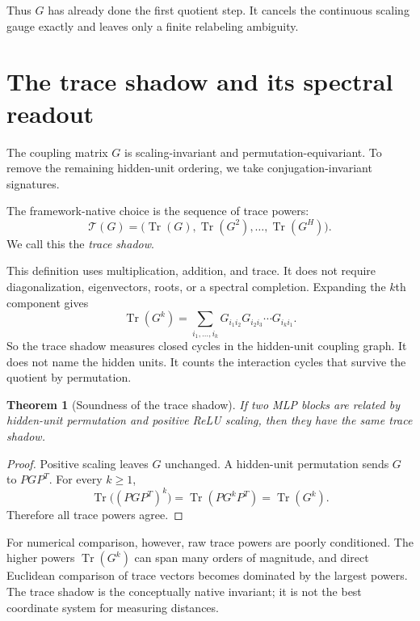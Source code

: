\documentclass[11pt]{article}
\newtheorem{theorem}{Theorem}
\newcommand{\Tr}{\operatorname{Tr}}
\newcommand{\TraceShadow}{\mathcal{T}}
\begin{document}
Thus $G$ has already done the first quotient step. It cancels the continuous scaling gauge exactly and leaves only a finite relabeling ambiguity.

\section{The trace shadow and its spectral readout}

The coupling matrix $G$ is scaling-invariant and permutation-equivariant. To remove the remaining hidden-unit ordering, we take conjugation-invariant signatures.

The framework-native choice is the sequence of trace powers:
\begin{equation}
  \TraceShadow(G)=\bigl(\Tr(G),\Tr(G^2),\ldots,\Tr(G^H)\bigr).
  \label{eq:trace-shadow}
\end{equation}
We call this the \emph{trace shadow}.

This definition uses multiplication, addition, and trace. It does not require diagonalization, eigenvectors, roots, or a spectral completion. Expanding the $k$th component gives
\begin{equation}
\Tr(G^k)=\sum_{i_1,\ldots,i_k}G_{i_1i_2}G_{i_2i_3}\cdots G_{i_ki_1}.
\label{eq:closed-walks}
\end{equation}
So the trace shadow measures closed cycles in the hidden-unit coupling graph. It does not name the hidden units. It counts the interaction cycles that survive the quotient by permutation.

\begin{theorem}[Soundness of the trace shadow]
If two MLP blocks are related by hidden-unit permutation and positive ReLU scaling, then they have the same trace shadow.
\end{theorem}

\begin{proof}
Positive scaling leaves $G$ unchanged. A hidden-unit permutation sends $G$ to $PGP^T$. For every $k\ge 1$,
\[
\Tr\bigl((PGP^T)^k\bigr)=\Tr(PG^kP^T)=\Tr(G^k).
\]
Therefore all trace powers agree.
\end{proof}

For numerical comparison, however, raw trace powers are poorly conditioned. The higher powers $\Tr(G^k)$ can span many orders of magnitude, and direct Euclidean comparison of trace vectors becomes dominated by the largest powers. The trace shadow is the conceptually native invariant; it is not the best coordinate system for measuring distances.
\end{document}
